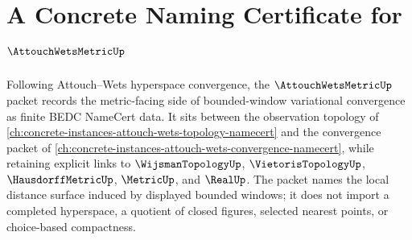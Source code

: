 \chapter{A Concrete Naming Certificate for $\AttouchWetsMetricUp$}
\label{ch:concrete-instances-attouch-wets-metric-namecert}

Following Attouch--Wets hyperspace convergence, the $\AttouchWetsMetricUp$ packet records the metric-facing side of bounded-window variational convergence as finite BEDC NameCert data. It sits between the observation topology of \autoref{ch:concrete-instances-attouch-wets-topology-namecert} and the convergence packet of \autoref{ch:concrete-instances-attouch-wets-convergence-namecert}, while retaining explicit links to $\WijsmanTopologyUp$, $\VietorisTopologyUp$, $\HausdorffMetricUp$, $\MetricUp$, and $\RealUp$. The packet names the local distance surface induced by displayed bounded windows; it does not import a completed hyperspace, a quotient of closed figures, selected nearest points, or choice-based compactness.

